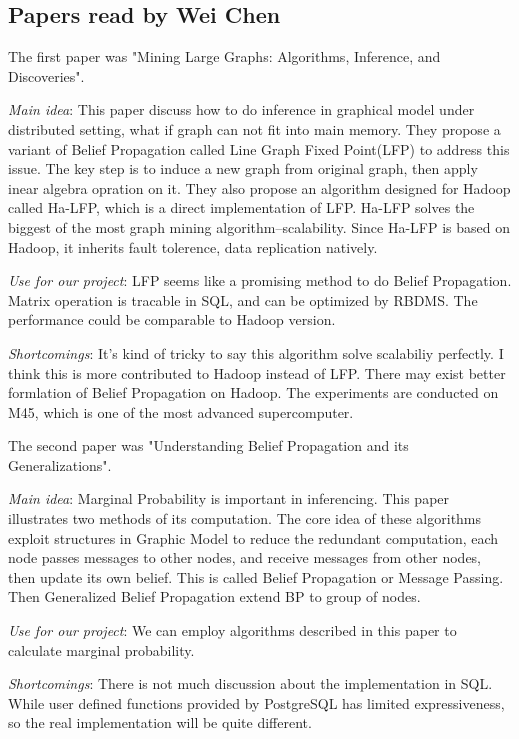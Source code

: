 \subsection{Papers read by Wei Chen}
The first paper was "Mining Large Graphs: Algorithms, Inference, and Discoveries".
\cite{DBLP:conf/icde/KangCF11}
\begin{itemize*}
\item {\em Main idea}: This paper discuss how to do inference in graphical model under distributed setting, what if graph can not fit into main memory. They propose a variant of Belief Propagation called Line Graph Fixed Point(LFP) to address this issue. The key step is to induce a new graph from original graph, then apply inear algebra opration on it. They also propose an algorithm designed for Hadoop called Ha-LFP, which is a direct implementation of LFP. Ha-LFP solves the biggest of the most graph mining algorithm--scalability. Since Ha-LFP is based on Hadoop, it inherits fault tolerence, data replication natively.
\item {\em Use for our project}:
      LFP seems like a promising method to do Belief Propagation. Matrix operation is tracable in SQL, and can be optimized by RBDMS. The performance could be comparable to Hadoop version.
\item {\em Shortcomings}:
      It's kind of tricky to say this algorithm solve scalabiliy perfectly. I think this is more contributed to Hadoop instead of LFP. There may exist better formlation of Belief Propagation on Hadoop. The experiments are conducted on M45, which is one of the most advanced supercomputer.
\end{itemize*}


The second paper was "Understanding Belief Propagation and its Generalizations".
\cite{bp}
\begin{itemize*}
\item {\em Main idea}: Marginal Probability is important in inferencing. This paper illustrates two methods of its computation. The core idea of these algorithms exploit structures in Graphic Model to reduce the redundant computation, each node passes messages to other nodes, and receive messages from other nodes, then update its own belief. This is called Belief Propagation or Message Passing. Then Generalized Belief Propagation extend BP to group of nodes.
\item {\em Use for our project}:
      We can employ algorithms described in this paper to calculate marginal probability.
\item {\em Shortcomings}:
       There is not much discussion about the implementation in SQL. While user defined functions provided by PostgreSQL has limited expressiveness, so the real implementation will be quite different.
\end{itemize*}


